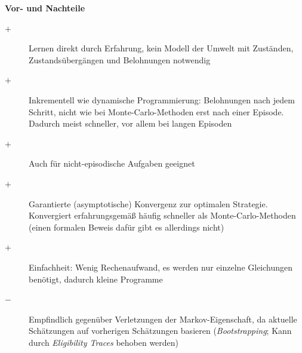 \documentclass[10pt]{scrartcl}
\begin{document}
\vspace{1em}
\textbf{Vor- und Nachteile}
\begin{description}
\item[$+$] Lernen direkt durch Erfahrung, kein Modell der Umwelt mit Zuständen, Zustandsübergängen und Belohnungen notwendig
\item[$+$] Inkrementell wie dynamische Programmierung: Belohnungen nach jedem Schritt, nicht wie bei Monte-Carlo-Methoden erst nach einer Episode. Dadurch meist schneller, vor allem bei langen Episoden
\item[$+$] Auch für nicht-episodische Aufgaben geeignet
\item[$+$] Garantierte (asymptotische) Konvergenz zur optimalen Strategie. Konvergiert erfahrungsgemäß häufig schneller als Monte-Carlo-Methoden (einen formalen Beweis dafür gibt es allerdings nicht)
\item[$+$] Einfachheit: Wenig Rechenaufwand, es werden nur einzelne Gleichungen benötigt, dadurch kleine Programme
\item[$-$] Empfindlich gegenüber Verletzungen der Markov-Eigenschaft, da aktuelle Schätzungen auf vorherigen Schätzungen basieren (\emph{Bootstrapping}; Kann durch \emph{Eligibility Traces} behoben werden)
\end{description}

\listoftodos
\end{document}
